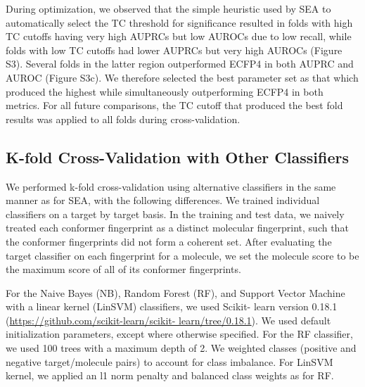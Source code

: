 \documentclass[../main.tex]{subfiles}
\begin{document}
\begin{refsection}
During optimization, we observed that the simple heuristic used by SEA to automatically select the TC threshold for significance resulted in folds with high TC cutoffs having very high AUPRCs but low AUROCs due to low recall, while folds with low TC cutoffs had lower AUPRCs but very high AUROCs (Figure S3).
Several folds in the latter region outperformed ECFP4 in both AUPRC and AUROC (Figure S3c).
We therefore selected the best parameter set as that which produced the highest  \AUCsum{} while simultaneously outperforming ECFP4 in both metrics.
For all future comparisons, the TC cutoff that produced the best fold results was applied to all folds during cross-validation.

\subsection*{K-fold Cross-Validation with Other Classifiers}

We performed k-fold cross-validation using alternative classifiers in the same manner as for SEA, with the following differences.
We trained individual classifiers on a target by target basis.
In the training and test data, we naively treated each conformer fingerprint as a distinct molecular fingerprint, such that the conformer fingerprints did not form a coherent set.
After evaluating the target classifier on each fingerprint for a molecule, we set the molecule score to be the maximum score of all of its conformer fingerprints.

For the Naive Bayes (NB), Random Forest (RF), and Support Vector Machine with a linear kernel (LinSVM) classifiers, we used Scikit- learn version 0.18.1 (\url{https://github.com/scikit-learn/scikit- learn/tree/0.18.1}).
We used default initialization parameters, except where otherwise specified.
For the RF classifier, we used 100 trees with a maximum depth of 2.
We weighted classes (positive and negative target/molecule pairs) to account for class imbalance.
For LinSVM kernel, we applied an l1 norm penalty and balanced class weights as for RF.


\end{refsection}
\end{document}
